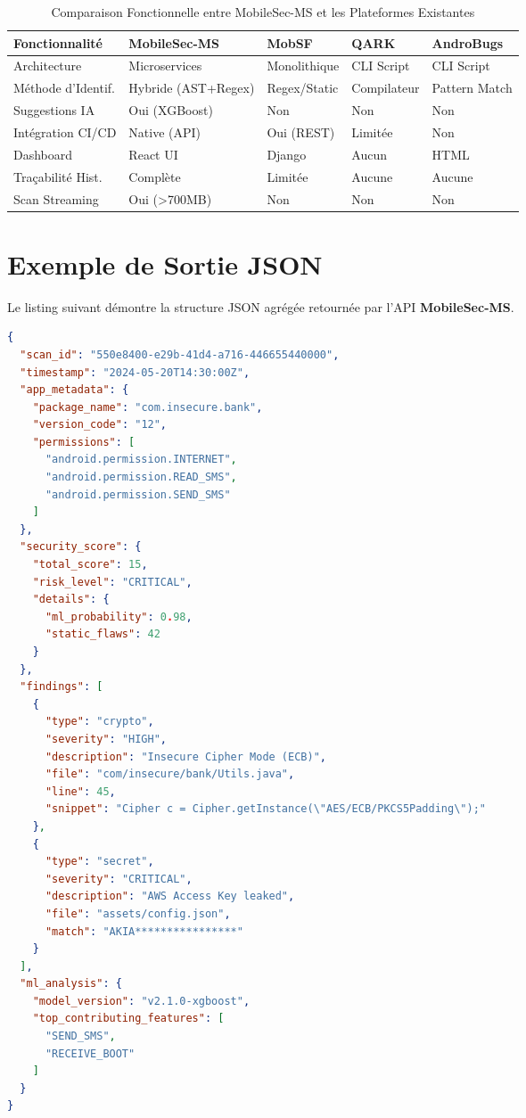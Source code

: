\documentclass[
  journal=largetwo,
  manuscript=article-type,
  year=2025,
  volume=1,
]{cup-journal}
\begin{document}
\begin{table}[hbt!]
\centering
\caption{Comparaison Fonctionnelle entre MobileSec-MS et les Plateformes Existantes}
\label{tab-func-comparison}
\begin{tabular}{p{3cm}p{3cm}p{3cm}p{3cm}p{3cm}}
\toprule
\textbf{Fonctionnalité} & \textbf{MobileSec-MS} & \textbf{MobSF} & \textbf{QARK} & \textbf{AndroBugs} \\
\midrule
Architecture & Microservices & Monolithique & CLI Script & CLI Script \\
Méthode d'Identif. & Hybride (AST+Regex) & Regex/Static & Compilateur & Pattern Match \\
Suggestions IA & Oui (XGBoost) & Non & Non & Non \\
Intégration CI/CD & Native (API) & Oui (REST) & Limitée & Non \\
Dashboard & React UI & Django & Aucun & HTML \\
Traçabilité Hist. & Complète & Limitée & Aucune & Aucune \\
Scan Streaming & Oui (>700MB) & Non & Non & Non \\
\bottomrule
\end{tabular}
\end{table}

\section{Exemple de Sortie JSON}
\label{app-json-output}

Le listing suivant démontre la structure JSON agrégée retournée par l'API \textbf{MobileSec-MS}.

\begin{lstlisting}[language=json, caption={Sortie JSON Tronquée de l'API MobileSec-MS}]
{
  "scan_id": "550e8400-e29b-41d4-a716-446655440000",
  "timestamp": "2024-05-20T14:30:00Z",
  "app_metadata": {
    "package_name": "com.insecure.bank",
    "version_code": "12",
    "permissions": [
      "android.permission.INTERNET",
      "android.permission.READ_SMS",
      "android.permission.SEND_SMS"
    ]
  },
  "security_score": {
    "total_score": 15,
    "risk_level": "CRITICAL",
    "details": {
      "ml_probability": 0.98,
      "static_flaws": 42
    }
  },
  "findings": [
    {
      "type": "crypto",
      "severity": "HIGH",
      "description": "Insecure Cipher Mode (ECB)",
      "file": "com/insecure/bank/Utils.java",
      "line": 45,
      "snippet": "Cipher c = Cipher.getInstance(\"AES/ECB/PKCS5Padding\");"
    },
    {
      "type": "secret",
      "severity": "CRITICAL",
      "description": "AWS Access Key leaked",
      "file": "assets/config.json",
      "match": "AKIA****************"
    }
  ],
  "ml_analysis": {
    "model_version": "v2.1.0-xgboost",
    "top_contributing_features": [
      "SEND_SMS",
      "RECEIVE_BOOT"
    ]
  }
}
\end{lstlisting}
\end{document}
